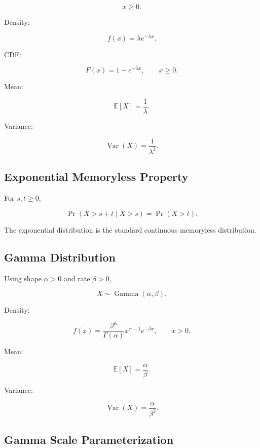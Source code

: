\[
\boxed{
x\geq0.
}
\]

Density:

\[
\boxed{
f(x)
=
\lambda e^{-\lambda x}.
}
\]

CDF:

\[
\boxed{
F(x)
=
1-e^{-\lambda x},
\qquad
x\geq0.
}
\]

Mean:

\[
\boxed{
\mathbb{E}[X]
=
\frac1\lambda.
}
\]

Variance:

\[
\boxed{
\operatorname{Var}(X)
=
\frac1{\lambda^2}.
}
\]

\subsection{Exponential Memoryless Property}
\label{subsec:exponential-memoryless}

For \(s,t\geq0\),

\[
\boxed{
\Pr(X>s+t\mid X>s)
=
\Pr(X>t).
}
\]

The exponential distribution is the standard continuous memoryless
distribution.

\subsection{Gamma Distribution}
\label{subsec:gamma-distribution-reference}

Using shape \(\alpha>0\) and rate \(\beta>0\),

\[
\boxed{
X\sim\operatorname{Gamma}(\alpha,\beta).
}
\]

Density:

\[
\boxed{
f(x)
=
\frac{
\beta^\alpha
}{
\Gamma(\alpha)
}
x^{\alpha-1}
e^{-\beta x},
\qquad
x>0.
}
\]

Mean:

\[
\boxed{
\mathbb{E}[X]
=
\frac{\alpha}{\beta}.
}
\]

Variance:

\[
\boxed{
\operatorname{Var}(X)
=
\frac{\alpha}{\beta^2}.
}
\]

\subsection{Gamma Scale Parameterization}
\label{subsec:gamma-scale-parameterization}

